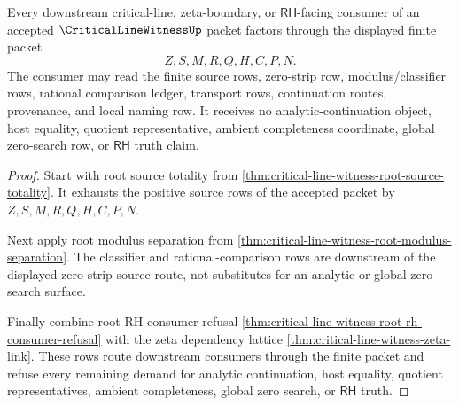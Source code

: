 \begin{theorem}
\label{thm:critical-line-witness-root-downstream-totality}
Every downstream critical-line, zeta-boundary, or $\mathsf{RH}$-facing consumer of an accepted $\CriticalLineWitnessUp$ packet factors through the displayed finite packet
$$
Z,S,M,R,Q,H,C,P,N.
$$
The consumer may read the finite source rows, zero-strip row, modulus/classifier rows, rational comparison ledger, transport rows, continuation routes, provenance, and local naming row. It receives no analytic-continuation object, host equality, quotient representative, ambient completeness coordinate, global zero-search row, or $\mathsf{RH}$ truth claim.
\end{theorem}
\begin{proof}
Start with root source totality from \autoref{thm:critical-line-witness-root-source-totality}. It exhausts the positive source rows of the accepted packet by $Z,S,M,R,Q,H,C,P,N$.

Next apply root modulus separation from \autoref{thm:critical-line-witness-root-modulus-separation}. The classifier and rational-comparison rows are downstream of the displayed zero-strip source route, not substitutes for an analytic or global zero-search surface.

Finally combine root RH consumer refusal \autoref{thm:critical-line-witness-root-rh-consumer-refusal} with the zeta dependency lattice \autoref{thm:critical-line-witness-zeta-link}. These rows route downstream consumers through the finite packet and refuse every remaining demand for analytic continuation, host equality, quotient representatives, ambient completeness, global zero search, or $\mathsf{RH}$ truth.
\end{proof}
